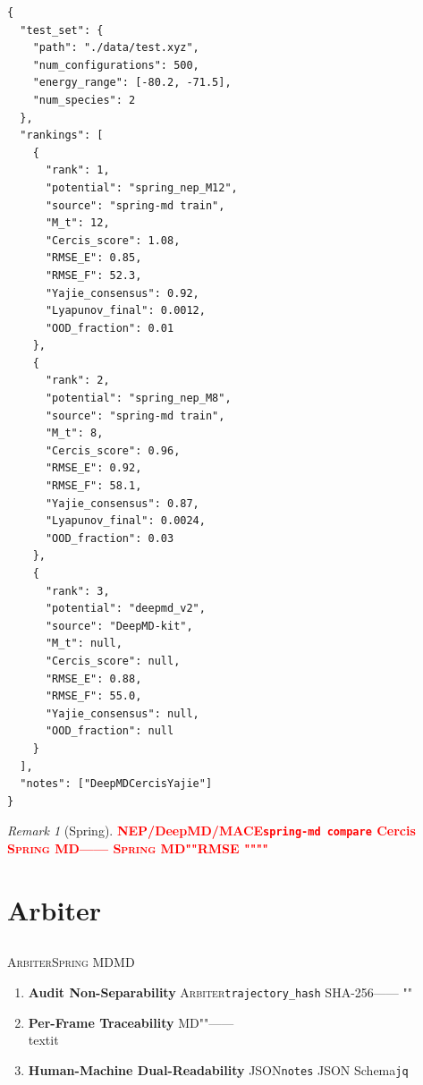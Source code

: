 \documentclass[12pt,a4paper]{article}
\theoremstyle{remark}
\newtheorem{remark}[theorem]{Remark}
\newcommand{\Arbiter}{\textsc{Arbiter}}
\newcommand{\SpringMD}{\textsc{Spring MD}}
\newcommand{\honestcrit}[1]{%
    \textcolor{red}{\textbf{#1}}%
}
\begin{document}
\begin{lstlisting}[caption={\texttt{ranking.json} },label=lst:ranking]
{
  "test_set": {
    "path": "./data/test.xyz",
    "num_configurations": 500,
    "energy_range": [-80.2, -71.5],
    "num_species": 2
  },
  "rankings": [
    {
      "rank": 1,
      "potential": "spring_nep_M12",
      "source": "spring-md train",
      "M_t": 12,
      "Cercis_score": 1.08,
      "RMSE_E": 0.85,
      "RMSE_F": 52.3,
      "Yajie_consensus": 0.92,
      "Lyapunov_final": 0.0012,
      "OOD_fraction": 0.01
    },
    {
      "rank": 2,
      "potential": "spring_nep_M8",
      "source": "spring-md train",
      "M_t": 8,
      "Cercis_score": 0.96,
      "RMSE_E": 0.92,
      "RMSE_F": 58.1,
      "Yajie_consensus": 0.87,
      "Lyapunov_final": 0.0024,
      "OOD_fraction": 0.03
    },
    {
      "rank": 3,
      "potential": "deepmd_v2",
      "source": "DeepMD-kit",
      "M_t": null,
      "Cercis_score": null,
      "RMSE_E": 0.88,
      "RMSE_F": 55.0,
      "Yajie_consensus": null,
      "OOD_fraction": null
    }
  ],
  "notes": ["DeepMDCercisYajie"]
}
\end{lstlisting}

\begin{remark}[Spring]
\honestcrit{NEP/DeepMD/MACE\texttt{spring-md compare}
Cercis
\SpringMD{}——
\SpringMD{}""RMSE
""""}
\end{remark}

\newpage

\section{Arbiter}

\subsection{}

\Arbiter{}\SpringMD{}MD


\begin{enumerate}[label=\textbf{ \arabic*},leftmargin=*,itemsep=4pt]
    \item \textbf{Audit Non-Separability}
    \Arbiter{}\texttt{trajectory\_hash}
    SHA-256——
    ""

    \item \textbf{Per-Frame Traceability}
    MD""——
    \\textit{}
    

    \item \textbf{Human-Machine Dual-Readability}
    JSON\texttt{notes}
    JSON Schema\texttt{jq}
\end{enumerate}
\end{document}
